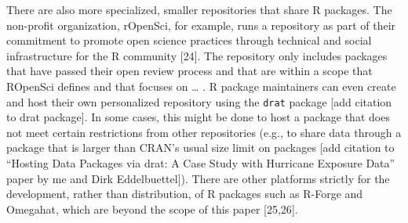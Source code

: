 \documentclass[10pt,letterpaper]{article}
\begin{document}
There are also more specialized, smaller repositories that share R
packages. The non-profit organization, rOpenSci, for example, runs a
repository as part of their commitment to promote open science practices
through technical and social infrastructure for the R community
{[}24{]}. The repository only includes packages that have passed their
open review process and that are within a scope that ROpenSci defines
and that focuses on \ldots{} . R package maintainers can even create and
host their own personalized repository using the \texttt{drat} package
{[}add citation to drat package{]}. In some cases, this might be done to
host a package that does not meet certain restrictions from other
repositories (e.g., to share data through a package that is larger than
CRAN's usual size limit on packages {[}add citation to ``Hosting Data
Packages via drat: A Case Study with Hurricane Exposure Data'' paper by
me and Dirk Eddelbuettel{]}). There are other platforms strictly for the
development, rather than distribution, of R packages such as R-Forge and
Omegahat, which are beyond the scope of this paper {[}25,26{]}.
\end{document}
